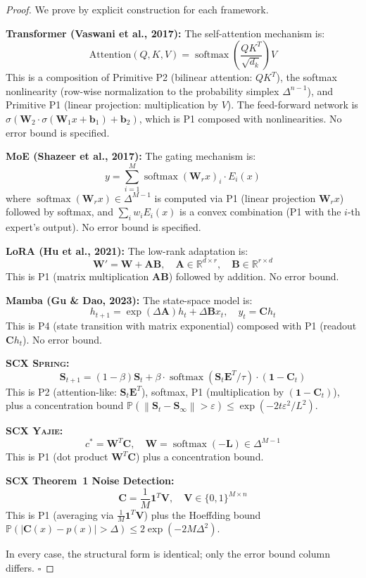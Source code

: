 \documentclass[12pt,a4paper]{article}
\theoremstyle{definition}
\newcommand{\Yajie}{\textsc{Yajie}}
\newcommand{\Spring}{\textsc{Spring}}
\newcommand{\SCX}{\textsc{SCX}}
\DeclareMathOperator{\softmax}{softmax}
\newcommand{\R}{\mathbb{R}}
\newcommand{\Pbb}{\mathbb{P}}
\newcommand{\norm}[1]{\left\lVert#1\right\rVert}
\newcommand{\ones}{\mathbf{1}}
\newcommand{\mat}[1]{\mathbf{#1}}
\newcommand{\simplex}{\Delta}
\begin{document}
\begin{proof}
We prove by explicit construction for each framework.

\textbf{Transformer (Vaswani et al., 2017):}
The self-attention mechanism is:
\[
\text{Attention}(Q, K, V) = \softmax\!\left(\frac{QK^T}{\sqrt{d_k}}\right) V
\]
This is a composition of Primitive P2 (bilinear attention: $QK^T$), the softmax
nonlinearity (row-wise normalization to the probability simplex $\simplex^{n-1}$),
and Primitive P1 (linear projection: multiplication by $V$). The feed-forward
network is $\sigma(\mat{W}_2 \cdot \sigma(\mat{W}_1 x + \mat{b}_1) + \mat{b}_2)$,
which is P1 composed with nonlinearities. No error bound is specified.

\textbf{MoE (Shazeer et al., 2017):}
The gating mechanism is:
\[
y = \sum_{i=1}^{M} \softmax(\mat{W}_r x)_i \cdot E_i(x)
\]
where $\softmax(\mat{W}_r x) \in \simplex^{M-1}$ is computed via P1 (linear projection
$\mat{W}_r x$) followed by softmax, and $\sum_i w_i E_i(x)$ is a convex combination
(P1 with the $i$-th expert's output). No error bound is specified.

\textbf{LoRA (Hu et al., 2021):}
The low-rank adaptation is:
\[
\mat{W}' = \mat{W} + \mat{A}\mat{B}, \quad \mat{A} \in \R^{d \times r}, \quad \mat{B} \in \R^{r \times d}
\]
This is P1 (matrix multiplication $\mat{A}\mat{B}$) followed by addition. No error bound.

\textbf{Mamba (Gu \& Dao, 2023):}
The state-space model is:
\[
h_{t+1} = \exp(\Delta \mat{A}) h_t + \Delta \mat{B} x_t, \quad y_t = \mat{C} h_t
\]
This is P4 (state transition with matrix exponential) composed with P1 (readout $\mat{C}h_t$).
No error bound.

\textbf{\SCX{} \Spring{}:} 
\[
\mat{S}_{t+1} = (1-\beta)\mat{S}_t + \beta \cdot \softmax(\mat{S}_t \mat{E}^T/\tau) \cdot (\ones - \mat{C}_t)
\]
This is P2 (attention-like: $\mat{S}_t \mat{E}^T$), softmax, P1 (multiplication by $(\ones - \mat{C}_t)$),
plus a concentration bound $\Pbb(\norm{\mat{S}_t - \mat{S}_\infty} > \varepsilon) \leq \exp(-2t\varepsilon^2/L^2)$.

\textbf{\SCX{} \Yajie{}:}
\[
c^* = \mat{W}^T \mat{C}, \quad \mat{W} = \softmax(-\mat{L}) \in \simplex^{M-1}
\]
This is P1 (dot product $\mat{W}^T \mat{C}$) plus a concentration bound.

\textbf{\SCX{} Theorem~1 Noise Detection:}
\[
\mat{C} = \frac{1}{M} \ones^T \mat{V}, \quad \mat{V} \in \{0,1\}^{M \times n}
\]
This is P1 (averaging via $\frac{1}{M}\ones^T \mat{V}$) plus the Hoeffding bound
$\Pbb(|\mat{C}(x) - p(x)| > \Delta) \leq 2\exp(-2M\Delta^2)$.

In every case, the structural form is identical; only the error bound column differs. \hfill $\square$
\end{proof}
\end{document}
